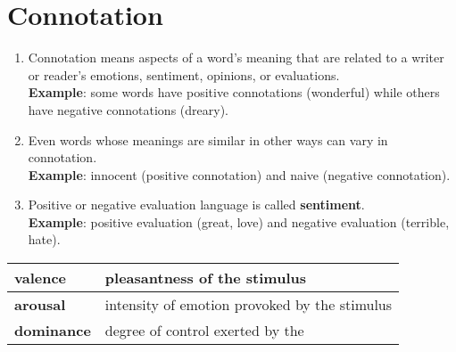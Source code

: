 \section{Connotation \cite{nlp-1}}\label{Connotation}
\begin{enumerate}
    \item Connotation means aspects of a word’s meaning that are related to a writer or reader’s emotions, sentiment, opinions, or evaluations.\\
    \textbf{Example}: some words have positive connotations (wonderful) while others have negative connotations (dreary).

    \item Even words whose meanings are similar in other ways can vary in connotation.\\
    \textbf{Example}: innocent (positive connotation) and naive (negative connotation).

    \item Positive or negative evaluation language is called \textbf{sentiment}.\\
    \textbf{Example}: positive evaluation (great, love) and negative evaluation (terrible, hate). 
\end{enumerate}

\begin{alternateColorTable}
\begin{table}[h!]
    \centering
    \begin{tabular}{|l|p{7cm}|}
        \hline
        \textbf{valence} & pleasantness of the stimulus \\
        \hline
        \textbf{arousal} & intensity of emotion provoked by the stimulus \\
        \hline
        \textbf{dominance} & degree of control exerted by the \\
        \hline
    \end{tabular}
\end{table}
\end{alternateColorTable}

